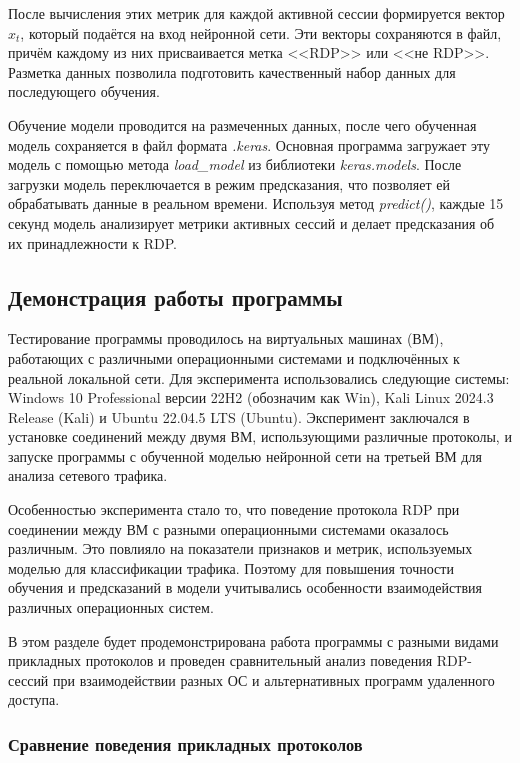\documentclass[bachelor, och, coursework]{SCWorks}
\begin{document}
После вычисления этих метрик для каждой активной сессии формируется вектор $x_t$, который подаётся на вход нейронной сети. 
Эти векторы сохраняются в файл, причём каждому из них присваивается метка <<RDP>> или <<не RDP>>. Разметка данных позволила 
подготовить качественный набор данных для последующего обучения.  

Обучение модели проводится на размеченных данных, после чего обученная модель сохраняется в файл формата \textit{.keras}. Основная программа 
загружает эту модель с помощью метода \textit{load_model} из библиотеки \textit{keras.models}. После загрузки модель переключается в 
режим предсказания, что позволяет ей обрабатывать данные в реальном времени. Используя метод \textit{predict()}, каждые 15 секунд модель 
анализирует метрики активных сессий и делает предсказания об их принадлежности к RDP.  

\subsection{Демонстрация работы программы}

Тестирование программы проводилось на виртуальных машинах (ВМ), работающих с различными операционными системами и подключённых к реальной локальной сети. 
Для эксперимента использовались следующие системы: Windows 10 Professional версии 22H2 (обозначим как Win), Kali Linux 2024.3 Release (Kali) и 
Ubuntu 22.04.5 LTS (Ubuntu). Эксперимент заключался в установке соединений между двумя ВМ, использующими различные протоколы, и запуске программы 
с обученной моделью нейронной сети на третьей ВМ для анализа сетевого трафика.

Особенностью эксперимента стало то, что поведение протокола RDP при соединении между ВМ с разными операционными системами оказалось различным. Это 
повлияло на показатели признаков и метрик, используемых моделью для классификации трафика. Поэтому для повышения точности обучения и предсказаний в 
модели учитывались особенности взаимодействия различных операционных систем.

В этом разделе будет продемонстрирована работа программы с разными видами прикладных протоколов и проведен сравнительный анализ поведения RDP-сессий 
при взаимодействии разных ОС и альтернативных программ удаленного доступа.

\subsubsection{Сравнение поведения прикладных протоколов}
\end{document}
